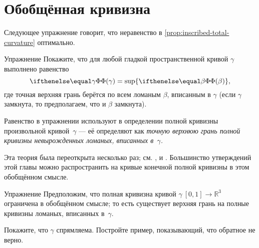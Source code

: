 \section{Обобщённая кривизна}

Следующее упражнение говорит, что неравенство в \ref{prop:inscribed-total-curvature} оптимально.

\begin{thm}{Упражнение}\label{ex:total-curvature=}
Покажите, что для любой гладкой пространственной кривой $\gamma$ выполнено равенство
\[\tc\gamma=\sup\{\tc\beta\},\]
где точная верхняя грань берётся по всем ломаным $\beta$, вписанным в $\gamma$
(если $\gamma$ замкнута, то предполагаем, что и $\beta$ замкнута).
\end{thm}

Равенство в упражнении используют в определении полной кривизны произвольной кривой~$\gamma$ --- её определяют как \textit{точную верхнюю грань полной кривизны невырожденных ломаных, вписанных в~$\gamma$.}

Эта теория была переоткрыта несколько раз; см. \cite[III §~1]{pogorelov}, \cite{aleksandrov-reshetnyak} и \cite{sullivan-curves}.
Большинство утверждений этой главы можно распространить на кривые конечной полной кривизны в этом обобщённом смысле.

\begin{thm}{Упражнение}\label{ex:tc-rectifiable}
Предположим, что полная кривизна кривой $\gamma\:[0,1]\to\mathbb{R}^3$ ограничена в обобщённом смысле;
то есть существует верхняя грань на полные кривизны ломаных, вписанных в~$\gamma$.

Покажите, что $\gamma$ спрямляема.
Постройте пример, показывающий, что обратное не верно. 
\end{thm}
